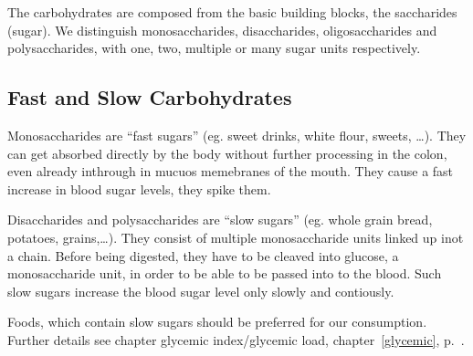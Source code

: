 \documentclass[../main.tex]{subfiles}
\begin{document}
The carbohydrates are composed from the basic building blocks, the saccharides (sugar).
We distinguish monosaccharides, disaccharides, oligosaccharides and polysaccharides, with one, two, multiple or many sugar units respectively.

\subsection{Fast and Slow Carbohydrates}

Monosaccharides are ``fast sugars'' (eg. sweet drinks, white flour, sweets, \ldots).
They can get absorbed directly by the body without further processing in the colon, even already inthrough in mucuos memebranes of the mouth.
They cause a fast increase in blood sugar levels, they spike them.

Disaccharides and polysaccharides are ``slow sugars'' (eg. whole grain bread, potatoes, grains,\ldots).
They consist of multiple monosaccharide units linked up inot a chain.
Before being digested, they have to be cleaved into glucose,
a monosaccharide unit, in order to be able to be passed into to the blood.
Such slow sugars increase the blood sugar level only slowly and contiously.

Foods, which contain slow sugars should be preferred for our consumption.
Further details see chapter glycemic index/glycemic load, chapter~\ref{glycemic}, p.~\pageref{glycemic}.
\end{document}
